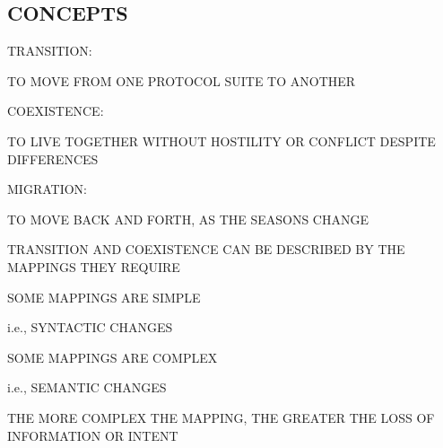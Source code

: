 \begin{bwslide}
\part*	{CONCEPTS}\bf

\begin{nrtc}
\item	TRANSITION:
    \begin{nrtc}
    \item	TO MOVE FROM ONE PROTOCOL SUITE TO ANOTHER
    \end{nrtc}

\item	COEXISTENCE:
    \begin{nrtc}
    \item	TO LIVE TOGETHER WITHOUT HOSTILITY OR CONFLICT DESPITE
		DIFFERENCES
    \end{nrtc}

\item	MIGRATION:
    \begin{nrtc}
    \item	TO MOVE BACK AND FORTH, AS THE SEASONS CHANGE
    \end{nrtc}
\end{nrtc}
\end{bwslide}


\begin{bwslide}

\begin{nrtc}
\item	TRANSITION AND COEXISTENCE CAN BE DESCRIBED BY THE MAPPINGS THEY
	REQUIRE

\item	SOME MAPPINGS ARE SIMPLE
    \begin{nrtc}
    \item	i.e., SYNTACTIC CHANGES
    \end{nrtc}

\item	SOME MAPPINGS ARE COMPLEX
    \begin{nrtc}
    \item	i.e., SEMANTIC CHANGES
    \end{nrtc}

\item	THE MORE COMPLEX THE MAPPING, THE GREATER THE LOSS OF INFORMATION OR
	INTENT
\end{nrtc}
\end{bwslide}



